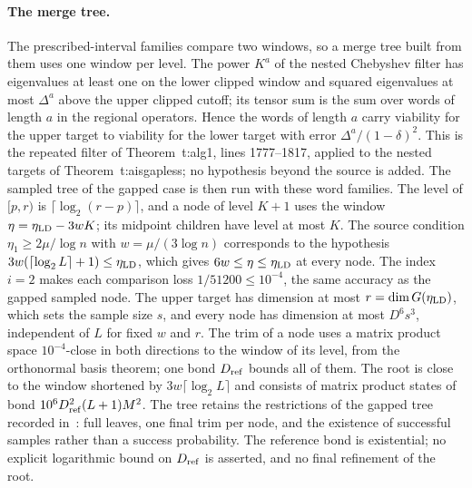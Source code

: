 \documentclass{article}
\begin{document}
\paragraph{The merge tree.}
The prescribed-interval families compare two windows, so a merge tree
built from them uses one window per level. The power $K^a$ of the nested
Chebyshev filter has eigenvalues at least one on the lower clipped window
and squared eigenvalues at most $\Delta^a$ above the upper clipped cutoff;
its tensor sum is the sum over words of length $a$ in the regional
operators. Hence the words of length $a$ carry viability for the upper
target to viability for the lower target with error
$\Delta^a/(1-\delta)^2$. This is the repeated filter of Theorem~t:alg1,
lines 1777--1817, applied to the nested targets of Theorem~t:aisgapless;
no hypothesis beyond the source is added. The sampled tree of the gapped
case is then run with these word families. The level of $[p,r)$ is
$\lceil\log_2(r-p)\rceil$, and a node of level $K+1$ uses the window
$\eta=\eta_{\rm LD}-3wK$; its midpoint children have level at most $K$.
The source condition $\eta_1\ge2\mu/\log n$ with $w=\mu/(3\log n)$
corresponds to the hypothesis $3w(\lceil\log_2L\rceil+1)\le\eta_{\rm LD}$,
which gives $6w\le\eta\le\eta_{\rm LD}$ at every node. The index $i=2$
makes each comparison loss $1/51200\le10^{-4}$, the same accuracy as the
gapped sampled node. The upper target has dimension at most
$r=\dim G(\eta_{\rm LD})$, which sets the sample size $s$, and every node
has dimension at most $D^6s^3$, independent of $L$ for fixed $w$ and $r$.
The trim of a node uses a matrix product space $10^{-4}$-close in both
directions to the window of its level, from the orthonormal basis
theorem; one bond $D_{\rm ref}$ bounds all of them. The root is close
to the window shortened by $3w\lceil\log_2L\rceil$ and consists of matrix
product states of bond $10^6D_{\rm ref}^2(L+1)M^2$.
The tree retains the restrictions of the gapped tree recorded
in~\cite{gap:alvv16_approximation_parameters}: full leaves, one final trim
per node, and the existence of successful samples rather than a success
probability. The reference bond is existential; no explicit logarithmic
bound on $D_{\rm ref}$ is asserted, and no final refinement of the root.
\end{document}
